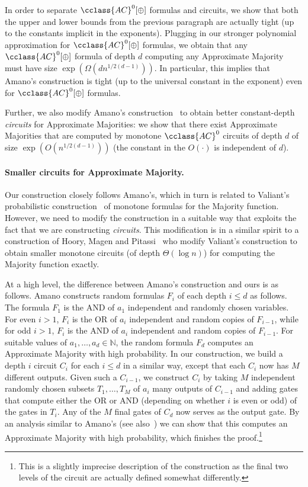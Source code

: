 \documentclass{toc}
\newcommand{\AC}{\cclass{AC}}
\begin{document}
In order to separate $\AC^0[\oplus]$ formulas and circuits, we show that both the upper and lower bounds from the previous paragraph are actually tight (up to the constants implicit in the exponents). Plugging in our stronger polynomial approximation for $\AC^0[\oplus]$ formulas, we obtain that any $\AC^0[\oplus]$ formula of depth $d$ computing any Approximate Majority must have size $\exp(\Omega(dn^{1/2(d-1)}))$. In particular, this implies that Amano's construction is tight (up to the universal constant in the exponent) even for $\AC^0[\oplus]$ formulas. 

Further, we also modify Amano's construction~\cite{Amano-appxmaj} to obtain better constant-depth \emph{circuits} for Approximate Majorities: we show that there exist Approximate Majorities that are computed by monotone $\AC^0$ circuits of depth $d$ of size $\exp(O(n^{1/2(d-1)}))$ (the constant in the $O(\cdot)$ is independent of $d$). 

\paragraph{Smaller circuits for Approximate Majority.} Our construction closely follows Amano's, which in turn is related to Valiant's probabilistic construction~\cite{Valiant-maj} of monotone formulas for the Majority function. However, we need to modify the construction in a suitable way that exploits the fact that we are constructing \emph{circuits}. This modification is in a similar spirit to a construction of Hoory, Magen and Pitassi~\cite{hoory2006monotone} who modify Valiant's construction to obtain smaller monotone circuits (of depth $\Theta(\log n)$) for computing the Majority function exactly.

At a high level, the difference between Amano's construction and ours is as
follows. Amano constructs random formulas $F_i$ of each depth $i\leq d$ as
follows. The formula $F_1$ is the AND of $a_1$ independent and randomly
chosen variables.
%
%
%
%
For even $i>1$, $F_i$ is the OR  of $a_i$ independent and random copies of $F_{i-1}$, while for odd $i > 1$, $F_i$ is the AND  of $a_i$ independent and random copies of $F_{i-1}$.
%
For suitable values
of $a_1,\ldots,a_d\in \mathbb{N}$, the random formula $F_d$ computes an
Approximate Majority with high probability. In our construction, we build
a depth $i$ circuit $C_i$ for each $i\leq d$ in a similar way, except that
each $C_i$ now has $M$ different outputs. Given such a $C_{i-1}$, we
construct $C_i$ by taking $M$ independent randomly chosen subsets
$T_1,\ldots,T_M$ of $a_i$ many outputs of $C_{i-1}$ and adding gates
that compute either the OR or AND (depending on whether $i$ is even
or odd) of the gates in $T_i$. Any of the $M$ final gates of $C_d$ now
serves as the output gate. By an analysis similar to Amano's
(see also~\cite{hoory2006monotone}) we can show that this computes an
Approximate Majority with high probability, which finishes
the proof.\footnote{This is a slightly imprecise description of the
construction as the final two levels of the circuit are actually defined
somewhat differently.}
\end{document}
